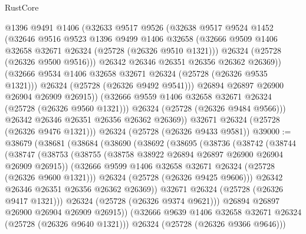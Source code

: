 \begin{lexlean}{RustCore}
\begin{coremodule}
                  @1396
                  @9491
                  @1406
                  (@32633
                    @9517
                    @9526
                    (@32638
                      @9517
                      @9524
                      @1452
                      (@32646
                        @9516
                        @9523
                        @1396
                        @9499
                        @1406
                        @32658
                        (@32666 @9509 @1406 @32658 @32671 @26324 (@25728 (@26326 @9510 @1321)))
                        @26324
                        (@25728 (@26326 @9500 @9516)))
                      @26342
                      @26346
                      @26351
                      @26356
                      @26362
                      @26369))
                  (@32666 @9534 @1406 @32658 @32671 @26324 (@25728 (@26326 @9535 @1321)))
                  @26324
                  (@25728 (@26326 @9492 @9541)))
                @26894
                @26897
                @26900
                @26904
                @26909
                @26915))
            (@32666 @9559 @1406 @32658 @32671 @26324 (@25728 (@26326 @9560 @1321)))
            @26324
            (@25728 (@26326 @9484 @9566)))
          @26342
          @26346
          @26351
          @26356
          @26362
          @26369))
      @32671
      @26324
      (@25728 (@26326 @9476 @1321)))
    @26324
    (@25728 (@26326 @9433 @9581))
@39000 := @38679
    (@38681
      (@38684
        (@38690
          (@38692
            (@38695
              (@38736
                (@38742
                  (@38744
                    (@38747
                      (@38753
                        (@38755 (@38758 @38922 @26894 @26897 @26900 @26904 @26909 @26915))
                        (@32666 @9599 @1406 @32658 @32671 @26324 (@25728 (@26326 @9600 @1321)))
                        @26324
                        (@25728 (@26326 @9425 @9606)))
                      @26342
                      @26346
                      @26351
                      @26356
                      @26362
                      @26369))
                  @32671
                  @26324
                  (@25728 (@26326 @9417 @1321)))
                @26324
                (@25728 (@26326 @9374 @9621)))
              @26894
              @26897
              @26900
              @26904
              @26909
              @26915))
          (@32666 @9639 @1406 @32658 @32671 @26324 (@25728 (@26326 @9640 @1321)))
          @26324
          (@25728 (@26326 @9366 @9646)))

\end{coremodule}
\end{lexlean}
